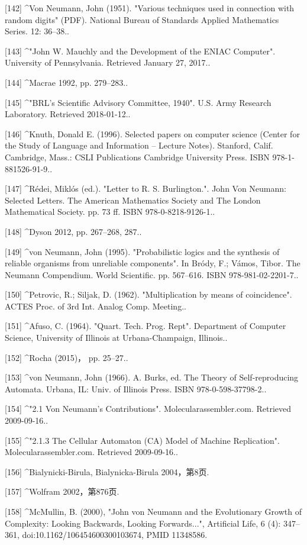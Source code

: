 [142]
^Von Neumann, John (1951). "Various techniques used in connection with random digits" (PDF). National Bureau of Standards Applied Mathematics Series. 12: 36–38..

[143]
^"John W. Mauchly and the Development of the ENIAC Computer". University of Pennsylvania. Retrieved January 27, 2017..

[144]
^Macrae 1992, pp. 279–283..

[145]
^"BRL's Scientific Advisory Committee, 1940". U.S. Army Research Laboratory. Retrieved 2018-01-12..

[146]
^Knuth, Donald E. (1996). Selected papers on computer science (Center for the Study of Language and Information – Lecture Notes). Stanford, Calif. Cambridge, Mass.: CSLI Publications Cambridge University Press. ISBN 978-1-881526-91-9..

[147]
^Rédei, Miklós (ed.). "Letter to R. S. Burlington.". John Von Neumann: Selected Letters. The American Mathematics Society and The London Mathematical Society. pp. 73 ff. ISBN 978-0-8218-9126-1..

[148]
^Dyson 2012, pp. 267–268, 287..

[149]
^von Neumann, John (1995). "Probabilistic logics and the synthesis of reliable organisms from unreliable components". In Bródy, F.; Vámos, Tibor. The Neumann Compendium. World Scientific. pp. 567–616. ISBN 978-981-02-2201-7..

[150]
^Petrovic, R.; Siljak, D. (1962). "Multiplication by means of coincidence". ACTES Proc. of 3rd Int. Analog Comp. Meeting..

[151]
^Afuso, C. (1964). "Quart. Tech. Prog. Rept". Department of Computer Science, University of Illinois at Urbana-Champaign, Illinois..

[152]
^Rocha (2015)， pp. 25–27..

[153]
^von Neumann, John (1966). A. Burks, ed. The Theory of Self-reproducing Automata. Urbana, IL: Univ. of Illinois Press. ISBN 978-0-598-37798-2..

[154]
^"2.1 Von Neumann's Contributions". Molecularassembler.com. Retrieved 2009-09-16..

[155]
^"2.1.3 The Cellular Automaton (CA) Model of Machine Replication". Molecularassembler.com. Retrieved 2009-09-16..

[156]
^Bialynicki-Birula, Bialynicka-Birula 2004，第8页.

[157]
^Wolfram 2002，第876页.

[158]
^McMullin, B. (2000), "John von Neumann and the Evolutionary Growth of Complexity: Looking Backwards, Looking Forwards...", Artificial Life, 6 (4): 347–361, doi:10.1162/106454600300103674, PMID 11348586.

